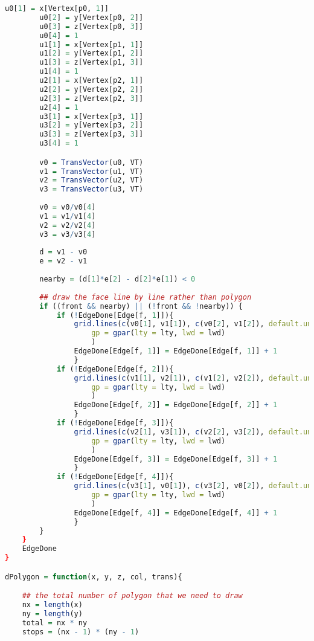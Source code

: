 \begin{lstlisting}[language = R]
        u0[1] = x[Vertex[p0, 1]]
        u0[2] = y[Vertex[p0, 2]]
        u0[3] = z[Vertex[p0, 3]]
        u0[4] = 1
        u1[1] = x[Vertex[p1, 1]]
        u1[2] = y[Vertex[p1, 2]]
        u1[3] = z[Vertex[p1, 3]]
        u1[4] = 1
        u2[1] = x[Vertex[p2, 1]]
        u2[2] = y[Vertex[p2, 2]]
        u2[3] = z[Vertex[p2, 3]]
        u2[4] = 1
        u3[1] = x[Vertex[p3, 1]]
        u3[2] = y[Vertex[p3, 2]]
        u3[3] = z[Vertex[p3, 3]]
        u3[4] = 1

        v0 = TransVector(u0, VT)
        v1 = TransVector(u1, VT)
        v2 = TransVector(u2, VT)
        v3 = TransVector(u3, VT)
        
        v0 = v0/v0[4]
        v1 = v1/v1[4]
        v2 = v2/v2[4]
        v3 = v3/v3[4]
        
        d = v1 - v0
        e = v2 - v1
        
        nearby = (d[1]*e[2] - d[2]*e[1]) < 0
        
        ## draw the face line by line rather than polygon
        if ((front && nearby) || (!front && !nearby)) {
            if (!EdgeDone[Edge[f, 1]]){
                grid.lines(c(v0[1], v1[1]), c(v0[2], v1[2]), default.units = 'native',
                    gp = gpar(lty = lty, lwd = lwd) 
                    )
                EdgeDone[Edge[f, 1]] = EdgeDone[Edge[f, 1]] + 1
                }
            if (!EdgeDone[Edge[f, 2]]){
                grid.lines(c(v1[1], v2[1]), c(v1[2], v2[2]), default.units = 'native',
                    gp = gpar(lty = lty, lwd = lwd) 
                    )
                EdgeDone[Edge[f, 2]] = EdgeDone[Edge[f, 2]] + 1
                }
            if (!EdgeDone[Edge[f, 3]]){
                grid.lines(c(v2[1], v3[1]), c(v2[2], v3[2]), default.units = 'native',
                    gp = gpar(lty = lty, lwd = lwd) 
                    )
                EdgeDone[Edge[f, 3]] = EdgeDone[Edge[f, 3]] + 1
                }
            if (!EdgeDone[Edge[f, 4]]){
                grid.lines(c(v3[1], v0[1]), c(v3[2], v0[2]), default.units = 'native',
                    gp = gpar(lty = lty, lwd = lwd)
                    )
                EdgeDone[Edge[f, 4]] = EdgeDone[Edge[f, 4]] + 1
                }
        }
    }
    EdgeDone
}

dPolygon = function(x, y, z, col, trans){

    ## the total number of polygon that we need to draw	
    nx = length(x)
    ny = length(y)
    total = nx * ny
    stops = (nx - 1) * (ny - 1)


\end{lstlisting}
